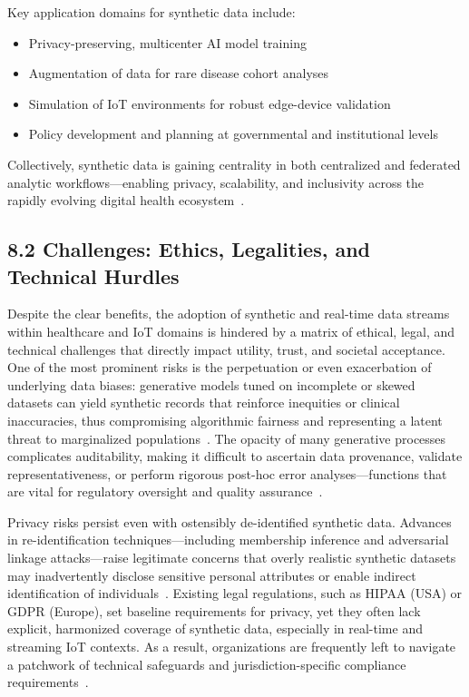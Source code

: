 \documentclass[11pt]{article}
\begin{document}
Key application domains for synthetic data include:

\begin{itemize}
    \item Privacy-preserving, multicenter AI model training
    \item Augmentation of data for rare disease cohort analyses
    \item Simulation of IoT environments for robust edge-device validation
    \item Policy development and planning at governmental and institutional levels
\end{itemize}

Collectively, synthetic data is gaining centrality in both centralized and federated analytic workflows—enabling privacy, scalability, and inclusivity across the rapidly evolving digital health ecosystem~\cite{ref91, ref106}.

\subsection{8.2 Challenges: Ethics, Legalities, and Technical Hurdles}

Despite the clear benefits, the adoption of synthetic and real-time data streams within healthcare and IoT domains is hindered by a matrix of ethical, legal, and technical challenges that directly impact utility, trust, and societal acceptance. One of the most prominent risks is the perpetuation or even exacerbation of underlying data biases: generative models tuned on incomplete or skewed datasets can yield synthetic records that reinforce inequities or clinical inaccuracies, thus compromising algorithmic fairness and representing a latent threat to marginalized populations~\cite{ref91}. The opacity of many generative processes complicates auditability, making it difficult to ascertain data provenance, validate representativeness, or perform rigorous post-hoc error analyses—functions that are vital for regulatory oversight and quality assurance~\cite{ref106}.

Privacy risks persist even with ostensibly de-identified synthetic data. Advances in re-identification techniques—including membership inference and adversarial linkage attacks—raise legitimate concerns that overly realistic synthetic datasets may inadvertently disclose sensitive personal attributes or enable indirect identification of individuals~\cite{ref91, ref106}. Existing legal regulations, such as HIPAA (USA) or GDPR (Europe), set baseline requirements for privacy, yet they often lack explicit, harmonized coverage of synthetic data, especially in real-time and streaming IoT contexts. As a result, organizations are frequently left to navigate a patchwork of technical safeguards and jurisdiction-specific compliance requirements~\cite{ref2, ref4, ref5, ref6, ref7, ref8, ref9, ref10, ref24, ref25, ref28, ref30, ref31, ref33, ref34, ref35, ref36, ref41, ref43, ref46, ref50, ref54, ref51, ref61, ref62, ref63, ref64, ref65, ref70, ref71, ref72, ref75, ref76, ref77, ref78, ref79, ref82, ref83, ref84, ref90, ref91}.
\end{document}
